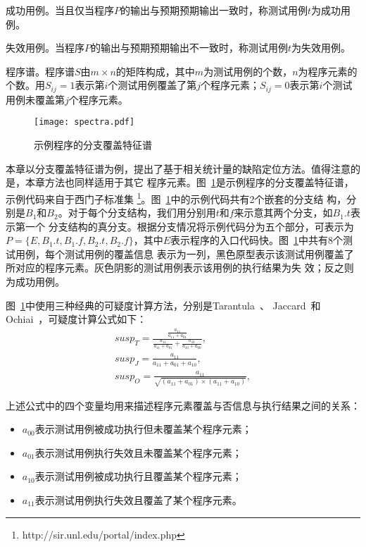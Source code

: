 \begin{Definition}
      成功用例。当且仅当程序$P$的输出与预期预期输出一致时，称测试用例$t$为成功用例。
\end{Definition}

\begin{Definition}
      失效用例。当程序$P$的输出与预期预期输出不一致时，称测试用例$t$为失效用例。
\end{Definition}

\begin{Definition}
      程序谱。程序谱$S$由$m\times n$的矩阵构成，其中$m$为测试用例的个数，$n$为程序元素的个数。用$S_{ij}=1$表示第$i$个测试用例覆盖了第$j$个程序元素；$S_{ij}=0$表示第$i$个测试用例未覆盖第$j$个程序元素。
\end{Definition}

\begin{figure}[htp]
      \centering
      \texttt{[image: spectra.pdf]}
      \caption{示例程序的分支覆盖特征谱}
      \label{fig:spectra}
\end{figure}

本章以分支覆盖特征谱为例，提出了基于相关统计量的缺陷定位方法。值得注意的是，本章方法也同样适用于其它
程序元素。图~\ref{fig:spectra}是示例程序的分支覆盖特征谱，示例代码来自于西门子标准集
\footnote{http://sir.unl.edu/portal/index.php}。图~\ref{fig:spectra}中的示例代码共有2个嵌套的分支结
构，分别是$B_1$和$B_2$。对于每个分支结构，我们用分别用$t$和$f$来示意其两个分支，如$B_1.t$表示第一个
分支结构的真分支。根据分支情况将示例代码分为五个部分，可表示为$P = \{E, B_1.t, B_1.f, B_2.t,
B_2.f\}$，其中$E$表示程序的入口代码快。图~\ref{fig:spectra}中共有8个测试用例，每个测试用例的覆盖信息
表示为一列，黑色原型表示该测试用例覆盖了所对应的程序元素。灰色阴影的测试用例表示该用例的执行结果为失
效；反之则为成功用例。

图~\ref{fig:spectra}中使用三种经典的可疑度计算方法，分别是Tarantula~\cite{jones2005empirical}、
Jaccard~\cite{abreu2007accuracy}和Ochiai~\cite{abreu2007accuracy}，可疑度计算公式如下：
\begin{eqnarray}
 susp_T = \frac{\frac{a_{11}}{a_{11}+a_{01}}}{\frac{a_{11}}{a_{11}+a_{01}}+\frac{a_{10}}{a_{10}+a_{00}}}, \label{eq:tar}\\
susp_J = \frac{a_{11}}{a_{11}+a_{01}+a_{10}}, \label{eq:jac}\\
susp_O = \frac{a_{11}}{\sqrt{(a_{11}+a_{01})\times(a_{11}+a_{10})}}, \label{eq:och}
\end{eqnarray}

上述公式中的四个变量均用来描述程序元素覆盖与否信息与执行结果之间的关系：
\begin{itemize}
  \item $a_{00}$表示测试用例被成功执行但未覆盖某个程序元素；
  \item $a_{01}$表示测试用例执行失效且未覆盖某个程序元素；
  \item $a_{10}$表示测试用例被成功执行且覆盖某个程序元素；
  \item $a_{11}$表示测试用例执行失效且覆盖了某个程序元素。
\end{itemize}


